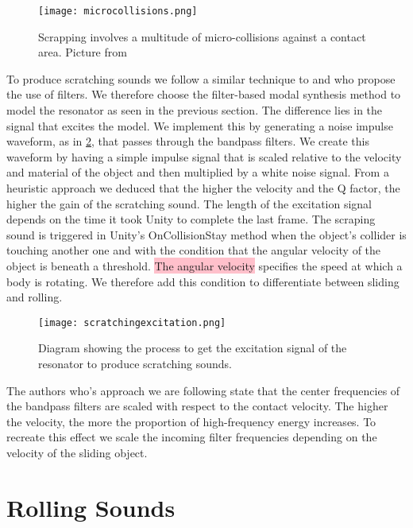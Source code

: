 \begin{figure}[H]
  \centering
    \texttt{[image: microcollisions.png]}
      \caption{Scrapping involves a multitude of micro-collisions against a contact area. Picture from \cite{gaver1993we}}
      \label{fig:microcollisions}
\end{figure}

To produce scratching sounds we follow a similar technique to \cite{gaver1993we} and \cite{van2001foleyautomatic} who propose the use of filters. We therefore choose the filter-based modal synthesis method to model the resonator as seen in the previous section. The difference lies in the signal that excites the model. We implement this by generating a noise impulse waveform, as in \ref{fig:scratchingimpulse}, that passes through the bandpass filters. We create this waveform by having a simple impulse signal that is scaled relative to the velocity and material of the object and then multiplied by a white noise signal. From a heuristic approach we deduced that the higher the velocity and the Q factor, the higher the gain of the scratching sound. The length of the excitation signal depends on the time it took Unity to complete the last frame. The scraping sound is triggered in Unity's OnCollisionStay method when the object's collider is touching another one and with the condition that the angular velocity of the object is beneath a threshold. \colorbox{pink}{The angular velocity} specifies the speed at which a body is rotating. We therefore add this condition to differentiate between sliding and rolling.

\begin{figure}[H]
  \centering
    \texttt{[image: scratchingexcitation.png]}
      \caption{Diagram showing the process to get the excitation signal of the resonator to produce scratching sounds.}
      \label{fig:scratchingimpulse}
\end{figure} 

The authors who's approach we are following state that the center frequencies of the bandpass filters are scaled with respect to the contact velocity. The higher the velocity, the more the proportion of high-frequency energy increases. To recreate this effect we scale the incoming filter frequencies depending on the velocity of the sliding object.

\section{Rolling Sounds}

